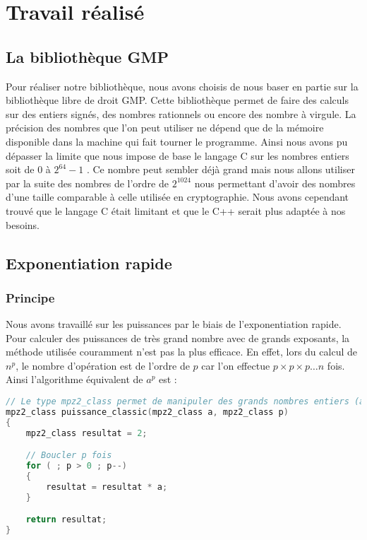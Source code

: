\chapter{Travail réalisé}
\section{La bibliothèque GMP}
Pour réaliser notre bibliothèque, nous avons choisis de nous baser en partie sur la bibliothèque libre de droit GMP. Cette bibliothèque permet de faire des calculs sur des entiers signés, des nombres rationnels ou encore des nombre à virgule. La précision des nombres que l'on peut utiliser ne dépend que de la mémoire disponible dans la machine qui fait tourner le programme. Ainsi nous avons pu dépasser la limite que nous impose de base le langage C sur les nombres entiers soit de $0$ à $2^{64}-1$ . Ce nombre peut sembler déjà grand mais nous allons utiliser par la suite des nombres de l'ordre de $2^{1024}$ nous permettant d'avoir des nombres d'une taille comparable à celle utilisée en cryptographie. Nous avons cependant trouvé que le langage C était limitant et que le C++ serait plus adaptée à nos besoins. 




\section{Exponentiation rapide}
\subsection{Principe}
Nous avons travaillé sur les puissances par le biais de l'exponentiation rapide. Pour calculer des puissances de très grand nombre avec de grands exposants, la méthode utilisée couramment n'est pas la plus efficace. En effet, lors du calcul de $n^p$, le nombre d'opération est de l'ordre de $p$ car l'on effectue $p\times p\times p \dotso n$ fois. Ainsi l'algorithme équivalent de $a^p$ est :

\begin{lstlisting}[language=C++]
// Le type mpz2_class permet de manipuler des grands nombres entiers (avec GMP)
mpz2_class puissance_classic(mpz2_class a, mpz2_class p)
{
    mpz2_class resultat = 2;

    // Boucler p fois
    for ( ; p > 0 ; p--)
    {
        resultat = resultat * a;
    }

    return resultat;
}
\end{lstlisting}


